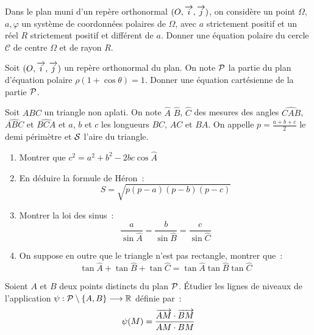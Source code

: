 \begin{exercice}
    Dans le plan muni d'un repère orthonormal \((O, \vi, \vj)\), on considère un 
    point \(\Omega\), \(a, \varphi\) un système de coordonnées polaires de 
    \(\Omega\), avec \(a\) strictement positif et un réel \(R\)  strictement 
    positif et différent de \(a\). Donner une équation polaire du cercle 
    \(\mathcal{C}\) de centre \(\Omega\) et de rayon \(R\).
\end{exercice}

\begin{exercice}
    Soit \((O, \vi, \vj)\) un repère orthonormal du plan. On note \(\P\) la 
    partie du plan d'équation polaire \(\rho(1 + \cos\theta) = 1\). Donner une 
    équation cartésienne de la partie \(\P\).
\end{exercice}

\begin{exercice}
    Soit \(ABC\) un triangle non aplati. On note \(\hat{A}\) \(\hat{B}\), 
    \(\hat{C}\) des mesures des angles \(\widehat{CAB}\), \(\widehat{ABC}\) et 
    \(\widehat{BCA}\) et \(a\), \(b\) et \(c\) les longueurs \(BC\), \(AC\) et 
    \(BA\). On appelle \(p = \frac{a + b + c}{2} \) le demi périmètre et \(\S\) 
    l'aire du triangle.
    \begin{enumerate}
        \item Montrer que \(c^2 = a^2 + b^2 - 2bc\cos \hat{A}\)
        \item En déduire la formule de Héron~:
            \begin{equation}
                S = \sqrt{p(p - a)(p - b)(p - c)}
            \end{equation}
        \item Montrer la loi des sinus~:
            \begin{equation}
                \frac{a}{\sin \hat{A}} = \frac{b}{\sin \hat{B}} = \frac{c}{\sin 
                \hat{C}}
            \end{equation}
        \item On suppose en outre que le triangle n'est pas rectangle, montrer 
            que~:
            \begin{equation}
                \tan \hat{A} + \tan \hat{B} + \tan \hat{C} = \tan \hat{A} \tan 
                \hat{B} \tan\hat{C}
            \end{equation}
    \end{enumerate}
\end{exercice}

\begin{exercice}
    Soient \(A\) et \(B\) deux points distincts du plan \(\P\). Étudier les 
    lignes de niveaux de l'application \(\fonctionR{\psi}{\P\setminus\{A, 
    B\}}{\R}\) définie par~:
    \begin{equation}
        \psi(M) = \frac{\vect{AM}\cdot\vect{BM}}{AM \cdot BM}
    \end{equation}
\end{exercice}

